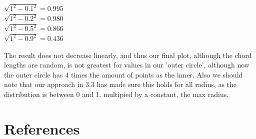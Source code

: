 \documentclass[addpoints]{exam}
\begin{document}
\begin{questions}
\begin{center}
$\sqrt{1^2 - 0.1^2} = 0.995$    \\
$\sqrt{1^2 - 0.2^2} = 0.980   $   \\
$\sqrt{1^2 - 0.5^2} = 0.866     $   \\
$\sqrt{1^2 - 0.9^2} = 0.436 $    \\
\end{center}
The result does not decrease linearly, and thus our final plot, although the chord lengths are random, is not greatest for values in our 'outer circle', although now the outer circle has 4 times the amount of points as the inner. Also we should note that our approach in 3.3 has made sure this holds for all radius, as the distribution is between 0 and 1, multipied by a constant, the max radius.
\end{questions}


\newpage
\section{References}

\noindent{}
\end{document}
